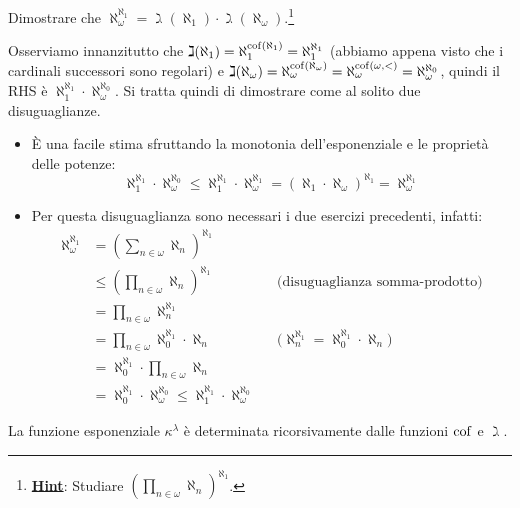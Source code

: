 \begin{exercise}
	Dimostrare che $\aleph_\omega^{\aleph_1} = \gimel(\aleph_1) \cdot \gimel(\aleph_\omega)$.\footnote{\underline{\textbf{Hint}}: Studiare $\left(\prod_{n \in \omega} \aleph_n\right)^{\aleph_1}$.}
\end{exercise}

\begin{soln}
	Osserviamo innanzitutto che $\gimel(\aleph_1) = \aleph_1^{\operatorname{cof}(\aleph_1)} = \aleph_1^{\aleph_1}$ (abbiamo appena visto che i cardinali successori sono regolari) e $\gimel(\aleph_\omega) = \aleph_{\omega}^{\operatorname{cof}(\aleph_{\omega})} = \aleph_{\omega}^{\operatorname{cof}(\omega,<)} = \aleph_\omega^{\aleph_0}$,
	quindi il RHS \`e $\aleph_1^{\aleph_1} \cdot \aleph_\omega^{\aleph_0}$. Si tratta quindi di dimostrare come al solito due disuguaglianze.
	\begin{itemize}
		\item[$\boxed{\geq}$] \`E una facile stima sfruttando la monotonia dell'esponenziale e le propriet\`a delle potenze:
		\[ \aleph_1^{\aleph_1}\cdot \aleph_\omega^{\aleph_0} \leq \aleph_1^{\aleph_1}\cdot \aleph_\omega^{\aleph_1} = (\aleph_1 \cdot \aleph_\omega)^{\aleph_1} = \aleph_\omega^{\aleph_1}
			\] 
		\item[$\boxed{\leq}$] Per questa disuguaglianza sono necessari i due esercizi precedenti, infatti:
		\begin{align*}
			\aleph_\omega^{\aleph_1} &= \left(\sum_{n \in \omega} \aleph_n\right)^{\aleph_1} \\
									 &\leq \left(\prod_{n \in \omega} \aleph_n\right)^{\aleph_1} &&\text{(disuguaglianza somma-prodotto)} \\
									 &= \prod_{n \in \omega}\aleph_n^{\aleph_1} \\
									 &= \prod_{n \in \omega} \aleph_0^{\aleph_1} \cdot \aleph_n &&\text{($\aleph_n^{\aleph_1} = \aleph_0^{\aleph_1}\cdot\aleph_n$)} \\
									 &= \aleph_0^{\aleph_1} \cdot \prod_{n \in \omega} \aleph_n \\
									 &= \aleph_0^{\aleph_1} \cdot \aleph_\omega^{\aleph_0} \leq \aleph_1^{\aleph_1} \cdot \aleph_\omega^{\aleph_0}
		\end{align*}
	\end{itemize}
\end{soln}

\begin{fact}
	La funzione esponenziale $\kappa^\lambda$ \`e determinata ricorsivamente dalle funzioni $\operatorname{cof}$ e $\gimel$.
\end{fact}

